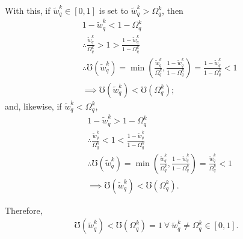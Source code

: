 \documentclass[hidelinks, nonatbib]{elsarticle}
\begin{document}
\begin{enumerate}
    With this, if $\tilde{w}_{q}^{k} \in [0,1]$ is set to $\tilde{w}_{q}^{k} > \Omega_{q}^{k}$, then
    \begin{align}
        &
        1 - \tilde{w}_{q}^{k}
        <
        1 - \Omega_{q}^{k}
        \\
        &\therefore
        \frac{
            \tilde{w}_{q}^{k}
        }{
            \Omega_{q}^{k}
        }
        >
        1
        >
        \frac{
            1 - \tilde{w}_{q}^{k}
        }{
            1 - \Omega_{q}^{k}
        }
        \\
        &\therefore
        \mho(\tilde{w}_{q}^{k}) 
        =
        \min\left(
            \frac{
                \tilde{w}_{q}^{k}
            }{
                \Omega_{q}^{k}
            }
            ,
            \frac{
                1 - \tilde{w}_{q}^{k}
            }{
                1 - \Omega_{q}^{k}
            }
        \right)
        =
        \frac{
            1 - \tilde{w}_{q}^{k}
        }{
            1 - \Omega_{q}^{k}
        }
        <
        1
        \\
        &\implies
        \mho(\tilde{w}_{q}^{k})
        <
        \mho(\Omega_{q}^{k})
        ;
    \end{align}
    and, likewise, if $\tilde{w}_{q}^{k} < \Omega_{q}^{k}$,
    \begin{align}
        &
        1 - \tilde{w}_{q}^{k}
        >
        1 - \Omega_{q}^{k}
        \\
        &\therefore
        \frac{
            \tilde{w}_{q}^{k}
        }{
            \Omega_{q}^{k}
        }
        <
        1
        <
        \frac{
            1 - \tilde{w}_{q}^{k}
        }{
            1 - \Omega_{q}^{k}
        }
        \\
        &\therefore
        \mho(\tilde{w}_{q}^{k}) 
        =
        \min\left(
            \frac{
                \tilde{w}_{q}^{k}
            }{
                \Omega_{q}^{k}
            }
            ,
            \frac{
                1 - \tilde{w}_{q}^{k}
            }{
                1 - \Omega_{q}^{k}
            }
        \right)
        =
        \frac{
            \tilde{w}_{q}^{k}
        }{
            \Omega_{q}^{k}
        }
        <
        1
        \\
        &\implies
        \mho(\tilde{w}_{q}^{k})
        <
        \mho(\Omega_{q}^{k})
        .
    \end{align}

    Therefore, 
    \begin{gather}
        \mho(\tilde{w}_{q}^{k}) < 
        \mho(\Omega_{q}^{k}) 
        = 1
        \
        \forall
        \
        \tilde{w}_{q}^{k}
        \neq
        \Omega_{q}^{k}
        \in [0,1]
        .
    \end{gather}


\end{enumerate}
\end{document}
